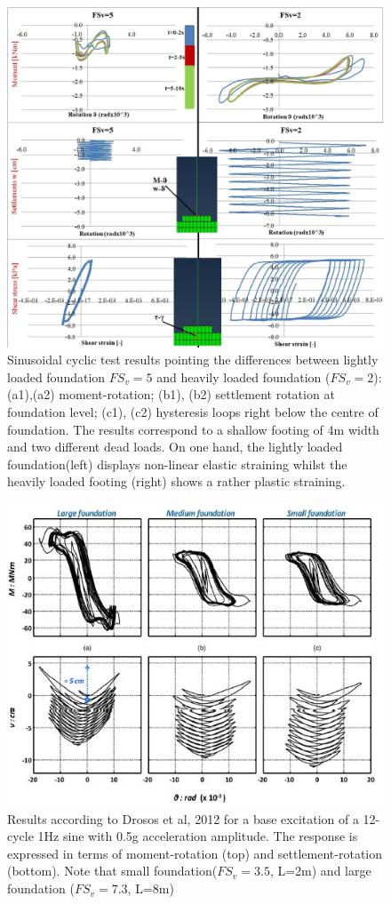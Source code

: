 	\begin{figure}
		\centering
		\includegraphics[width=1\linewidth]{"sin_4m"}
		\caption{Sinusoidal cyclic test results pointing the \mbox{differences} between lightly loaded foundation $FS_v=5$ and heavily loaded foundation ($FS_v=2$): (a1),(a2) moment-rotation; (b1), (b2) settlement rotation at foundation level; (c1), (c2) hysteresis loops right below the centre of foundation. The results correspond to a shallow footing of 4m width and two different dead loads. On one hand, the lightly loaded foundation(left) displays non-linear elastic straining whilst the heavily loaded footing (right) shows a rather plastic straining.}
		\label{sin}
\end{figure}

\begin{figure}[!h]
	\centering
	\includegraphics[width=0.6\linewidth]{"drosos2"}
	\caption{Results according to Drosos et al, 2012 for a base excitation of a 12-cycle 1Hz sine with 0.5g acceleration amplitude. The response is expressed in terms of moment-rotation (top) and settlement-rotation (bottom). Note that small foundation($FS_v=3.5$, L=2m) and large foundation ($FS_v=7.3$, L=8m)}
	\label{drosos}
\end{figure}

